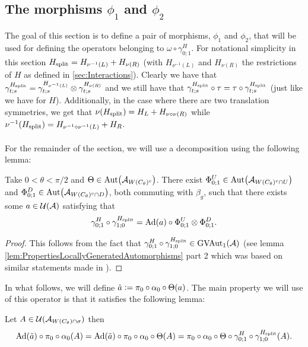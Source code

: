 \documentclass[11pt,a4paper,twoside]{article}
\numberwithin{equation}{section}
\begin{document}
	\subsection{The morphisms \texorpdfstring{$\phi_1$}{} and \texorpdfstring{$\phi_2$}{}}
	The goal of this section is to define a pair of morphisms, $\phi_1$ and $\phi_2$, that will be used for defining the operators belonging to $\omega\circ\gamma^H_{0;1}$. For notational simplicity in this section ${H_{\text{split}}}=H_{\nu^{-1}(L)}+H_{\nu(R)}$ (with $H_{\nu^{-1}(L)}$ and $H_{\nu(R)}$ the restrictions of $H$ as defined in \ref{sec:Interactions}). Clearly we have that $\gamma^{{H_{\text{split}}}}_{t;s}=\gamma^{H_{\nu^{-1}(L)}}_{t;s}\otimes\gamma^{H_{\nu(R)}}_{t;s}$ and we still have that $\gamma^{{H_{\text{split}}}}_{t;s}\circ\tau=\tau\circ\gamma^{{H_{\text{split}}}}_{t;s}$ (just like we have for $H$). Additionally, in the case where there are two translation symmetries, we get that $\nu({H_{\text{split}}})=H_L+H_{\nu\circ\nu(R)}$ while $\nu^{-1}({H_{\text{split}}})=H_{\nu^{-1}\circ\nu^{-1}(L)}+H_{R}$.\\\\
	For the remainder of the section, we will use a decomposition using the following lemma:
	\begin{lemma}\label{lem:DefinitionOfGroupMorphismVAutEquation}
		Take $0<\theta<\pi/2$ and $\Theta\in \Aut{\AA_{W(C_\theta)^c}}$. There exist $\Phi^U_{0;1}\in\Aut{\AA_{W(C_\theta)^c\cap U}}$ and $\Phi^D_{0;1}\in\Aut{\AA_{W(C_\theta)^c\cap D}}$, both commuting with $\beta_g$, such that there exists some $a\in\mathcal U(\mathcal A)$ satisfying that
		\begin{equation}\label{eq:DefinitionOfGroupMorphismVAutEquation}
			\gamma^H_{0;1}\circ\gamma^{\Hsplit}_{1;0}=\Ad{a}\circ \Phi^U_{0;1}\otimes\Phi^D_{0;1}.
		\end{equation}
	\end{lemma}
	\begin{proof}
		This follows from the fact that $\gamma^H_{0;1}\circ\gamma^{{H_{\text{split}}}}_{1;0}\in \textrm{GVAut}_1(\mathcal A)$ (see lemma \ref{lem:PropertiesLocallyGeneratedAutomorphisms} part 2 which was based on similar statements made in \cite{ogata2021h3gmathbb}).
	\end{proof}
	In what follows, we will define $\tilde{a}\vcentcolon= \pi_0\circ\alpha_0\circ\Theta(a)$. The main property we will use of this operator is that it satisfies the following lemma:
	\begin{lemma}\label{lem:PropertyTilde_a}
		Let $A\in\mathcal U(\mathcal A_{W(C_\theta)\cap\sigma})$ then
		\begin{equation}
			\Ad{\tilde{a}}\circ\pi_0\circ\alpha_0(A)=\Ad{\tilde{a}}\circ\pi_0\circ\alpha_0\circ\Theta(A)=\pi_0\circ\alpha_0\circ\Theta\circ\gamma^H_{0;1}\circ\gamma^{\Hsplit}_{1;0}(A).
		\end{equation}
	\end{lemma}
\end{document}
